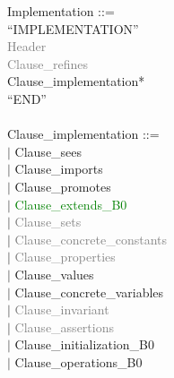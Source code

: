\documentclass[12pt,a4paper,draft]{article}
\begin{document}
\footnotesize{
\begin{sloppypar} 
\noindent Implementation ::=\\
\hspace*{0.20in} ``IMPLEMENTATION''\\
\hspace*{0.20in} \textcolor{gray}{Header}\\
\hspace*{0.20in} \textcolor{gray}{Clause\_refines}\\
\hspace*{0.20in} Clause\_implementation*\\
\hspace*{0.20in} ``END'' \\
\\
Clause\_implementation ::=\\
\hspace*{0.20in} $|$ {Clause\_sees}\\
\hspace*{0.20in} $|$ {Clause\_imports}\\
\hspace*{0.20in} $|$ {Clause\_promotes}\\
\hspace*{0.20in} $|$ \textcolor{green}{Clause\_extends\_B0}\\
\hspace*{0.20in} $|$ \textcolor{gray}{Clause\_sets}\\
\hspace*{0.20in} $|$ \textcolor{gray}{Clause\_concrete\_constants}\\
\hspace*{0.20in} $|$ \textcolor{gray}{Clause\_properties}\\
\hspace*{0.20in} $|$ Clause\_values\\
\hspace*{0.20in} $|$ Clause\_concrete\_variables\\
\hspace*{0.20in} $|$ \textcolor{gray}{Clause\_invariant}\\
\hspace*{0.20in} $|$ \textcolor{gray}{Clause\_assertions}\\
\hspace*{0.20in} $|$ Clause\_initialization\_B0\\
\hspace*{0.20in} $|$ Clause\_operations\_B0\\
\end{sloppypar}}
\end{document}
